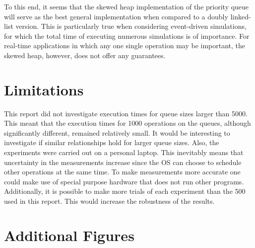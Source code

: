\documentclass{article}
\begin{document}
To this end, it seems that the skewed heap implementation of the priority queue will serve as the best general implementation when compared to a doubly linked-list version. This is particularly true when considering event-driven simulations, for which the total time of executing numerous simulations is of importance. For real-time applications in which any one single operation may be important, the skewed heap, however, does not offer any guarantees.



\section{Limitations}
This report did not investigate execution times for queue sizes larger than 5000. This meant that the execution times for 1000 operations on the queues, although significantly different, remained relatively small. It would be interesting to investigate if similar relationships hold for larger queue sizes. Also, the experiments were carried out on a personal laptop. This inevitably means that uncertainty in the measurements increase since the OS can choose to schedule other operations at the same time. To make measurements more accurate one could make use of special purpose hardware that does not run other programs. Additionally, it is possible to make more trials of each experiment than the 500 used in this report. This would increase the robustness of the results.

\pagebreak



\appendix



\section{Additional Figures}
\end{document}

